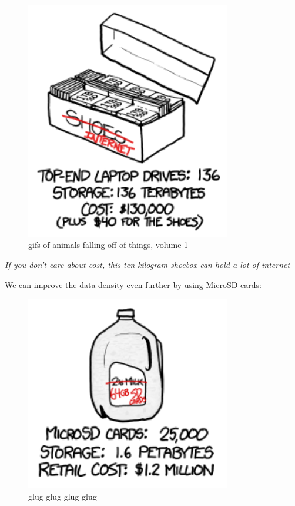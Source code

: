 \begin{figure}[!htbp]
\centering
\includegraphics[scale=0.5, max width=0.8\textwidth]{imgs/a/31/fedex_drives.png}
\caption{gifs of animals falling off of things, volume 1}
\end{figure}

{ \emph{If you don’t care about cost, this ten-kilogram shoebox can hold a lot of internet} }

{We can improve the data density even further by using MicroSD cards:}

\begin{figure}[!htbp]
\centering
\includegraphics[scale=0.5, max width=0.8\textwidth]{imgs/a/31/fedex_milk.png}
\caption{glug glug glug glug}
\end{figure}

